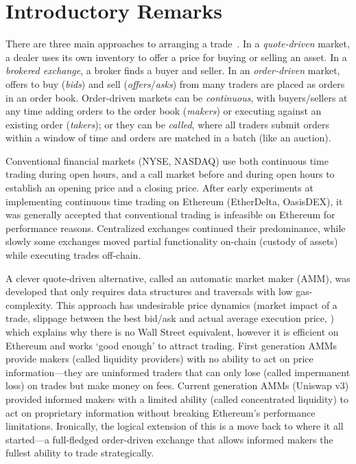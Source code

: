 



\section{Introductory Remarks}

There are three main approaches to arranging a trade~\cite{Har03}. In a \emph{quote-driven} market, a dealer uses its own inventory to offer a price for buying or selling an asset. In a \emph{brokered exchange}, a broker finds a buyer and seller. In an \emph{order-driven} market, offers to buy (\emph{bids}) and sell (\emph{offers}/\emph{asks}) from many traders are placed as orders in an order book. Order-driven markets can be \emph{continuous}, with buyers/sellers at any time adding orders to the order book (\emph{makers}) or executing against an existing order (\emph{takers}); or they can be \emph{called}, where all traders submit orders within a window of time and orders are matched in a batch (like an auction). 

Conventional financial markets (\eg NYSE, NASDAQ) use both continuous time trading during open hours, and a call market before and during open hours to establish an opening price and a closing price. After early experiments at implementing continuous time trading on Ethereum (\eg EtherDelta, OasisDEX), it was generally accepted that conventional trading is infeasible on Ethereum for performance reasons. Centralized exchanges continued their predominance, while slowly some exchanges moved partial functionality on-chain (\eg custody of assets) while executing trades off-chain. 

A clever quote-driven alternative, called an automatic market maker (AMM), was developed that only requires data structures and traversals with low gas-complexity. This approach has undesirable price dynamics (\eg market impact of a trade, slippage between the best bid/ask and actual average execution price, \etc) which explains why there is no Wall Street equivalent, however it is efficient on Ethereum and works `good enough' to attract trading. First generation AMMs provide makers (called liquidity providers) with no ability to act on price information---they are uninformed traders that can only lose (called impermanent loss) on trades but make money on fees. Current generation AMMs (\eg Uniswap v3) provided informed makers with a limited ability (called concentrated liquidity) to act on proprietary information without breaking Ethereum's performance limitations. Ironically, the logical extension of this is a move back to where it all started---a full-fledged order-driven exchange that allows informed makers the fullest ability to trade strategically.



